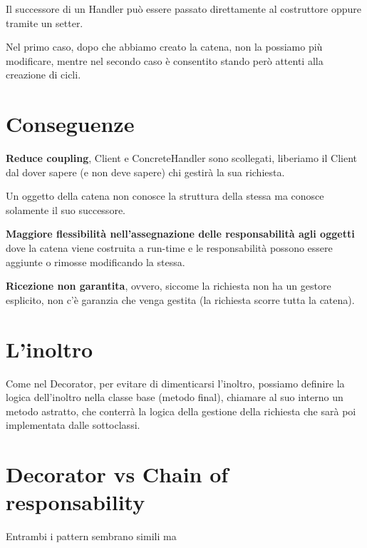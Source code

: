 Il successore di un Handler può essere passato direttamente al costruttore oppure tramite un setter.

Nel primo caso, dopo che abbiamo creato la catena, non la possiamo più modificare, mentre nel secondo caso è consentito stando però attenti alla creazione di cicli.

\section{Conseguenze}

\textbf{Reduce coupling}, Client e ConcreteHandler sono scollegati, liberiamo il Client dal dover sapere (e non deve sapere) chi gestirà la sua richiesta. 

Un oggetto della catena non conosce la struttura della stessa ma conosce solamente il suo successore.

\textbf{Maggiore flessibilità nell'assegnazione delle responsabilità agli oggetti} dove la catena viene costruita a run-time e le responsabilità possono essere 
aggiunte o rimosse modificando la stessa.

\textbf{Ricezione non garantita}, ovvero, siccome la richiesta non ha un gestore esplicito, non c'è garanzia che venga gestita (la richiesta scorre tutta la catena).

\section{L'inoltro}

Come nel Decorator, per evitare di dimenticarsi l'inoltro, possiamo definire la logica dell'inoltro nella classe base (metodo final), chiamare al suo interno un metodo 
astratto, che conterrà la logica della gestione della richiesta che sarà poi implementata dalle sottoclassi.

\section{Decorator vs Chain of responsability}

Entrambi i pattern sembrano simili ma 

